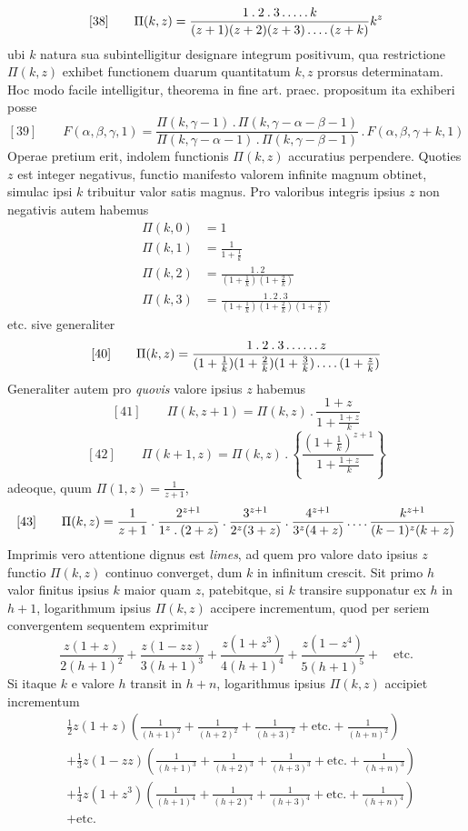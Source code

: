 \[
[38]\qquad \Pi(k,z)=\frac{1\mathbin{.}2\mathbin{.}3\mathinner{.\,.\,.\,.\,.}k}{(z+1)(z+2)(z+3)\mathinner{.\,.\,.\,.}(z+k)}k^z
\]
ubi $k$ natura sua subintelligitur designare integrum positivum, qua restrictione
$\Pi(k,z)$ exhibet functionem duarum quantitatum $k,z$ prorsus determinatam. Hoc
modo facile intelligitur, theorema in fine art. praec. propositum ita exhiberi posse
\[
[39]\qquad F(\alpha,\beta,\gamma,1)=\frac{\Pi(k,\gamma-1)\mathbin{.}\Pi(k,\gamma-\alpha-\beta-1)}{\Pi(k,\gamma-\alpha-1)\mathbin{.}\Pi(k,\gamma-\beta-1)}\mathbin{.}F(\alpha,\beta,\gamma+k,1)
\]
Operae pretium erit, indolem functionis $\Pi(k,z)$ accuratius perpendere.
Quoties $z$ est integer negativus, functio manifesto valorem infinite magnum obtinet, simulac ipsi $k$ tribuitur valor satis magnus. Pro valoribus integris
ipsius $z$ non negativis autem habemus
\[
\begin{aligned}
\Pi(k,0)&=1\\[5pt]
\Pi(k,1)&=\frac{1}{1+\frac1k}\\[5pt]
\Pi(k,2)&=\frac{1\mathbin{.}2}{(1+\frac1k)(1+\frac2k)}\\[5pt]
\Pi(k,3)&=\frac{1\mathbin{.}2\mathbin{.}3}{(1+\frac1k)(1+\frac2k)(1+\frac3k)}
\end{aligned}
\]
etc. sive generaliter
\[
[40]\qquad \Pi(k,z)=\frac{1\mathbin{.}2\mathbin{.}3\mathinner{.\,.\,.\,.\,.\,.}z}{(1+\frac1k)(1+\frac2k)(1+\frac3k)\mathinner{.\,.\,.\,.}(1+\frac zk)}
\]
Generaliter autem pro \textit{quovis} valore ipsius $z$ habemus
\[
[41]\qquad \Pi(k,z+1)=\Pi(k,z)\mathbin{.}\frac{1+z}{1+\frac{1+z}{k}}
\]
\[
[42]\qquad \Pi(k+1,z)=\Pi(k,z)\mathbin{.}\left\{\frac{(1+\frac1k)^{z+1}}{1+\frac{1+z}{k}}\right\}
\]
adeoque, quum $\Pi(1,z)=\frac1{z+1}$,
\[
[43]\qquad \Pi(k,z)=\frac1{z+1}\mathbin{.}\frac{2^{z+1}}{1^z\mathbin{.}(2+z)}\mathbin{.}\frac{3^{z+1}}{2^z(3+z)}\mathbin{.}\frac{4^{z+1}}{3^z(4+z)}\mathinner{.\,.\,.\,.}\frac{k^{z+1}}{(k-1)^z(k+z)}
\]
Imprimis vero attentione dignus est \textit{limes}, ad quem pro valore dato ipsius
$z$ functio $\Pi(k,z)$ continuo converget, dum $k$ in infinitum crescit. Sit primo $h$
valor finitus ipsius $k$ maior quam $z$, patebitque, si $k$ transire supponatur ex $h$ in
$h+1$, logarithmum ipsius $\Pi(k,z)$ accipere incrementum, quod per seriem convergentem sequentem exprimitur
\[
\frac{z(1+z)}{2(h+1)^2}+\frac{z(1-zz)}{3(h+1)^3}+\frac{z(1+z^3)}{4(h+1)^4}+\frac{z(1-z^4)}{5(h+1)^5}+\quad\text{etc.}
\]
Si itaque $k$ e valore $h$ transit in $h+n$, logarithmus ipsius $\Pi(k,z)$ accipiet incrementum
\[
\begin{aligned}
&\tfrac12 z(1+z)\left(\frac1{(h+1)^2}+\frac1{(h+2)^2}+\frac1{(h+3)^2}+\text{etc.}+\frac1{(h+n)^2}\right)\\[5pt]
&+\tfrac13 z(1-zz)\left(\frac1{(h+1)^3}+\frac1{(h+2)^3}+\frac1{(h+3)^3}+\text{etc.}+\frac1{(h+n)^3}\right)\\[5pt]
&+\tfrac14 z(1+z^3)\left(\frac1{(h+1)^4}+\frac1{(h+2)^4}+\frac1{(h+3)^4}+\text{etc.}+\frac1{(h+n)^4}\right)\\[5pt]
&+\text{etc.}
\end{aligned}
\]

